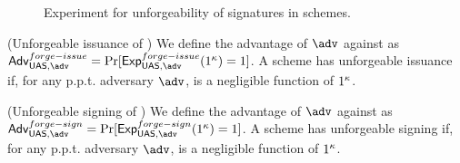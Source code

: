 \begin{figure}[htp!]
  \caption{Experiment for unforgeability of signatures in \UAS schemes.}
  \label{fig:exp-uas-unfor-sign}
\end{figure}

\begin{definition}{(Unforgeable issuance of \UAS)}
  \label{def:issue-forge-uas}  
  We define the advantage \AdvForgeIssue of $\adv$ against \ExpForgeIssue as
  $\AdvForgeIssue=\Pr\lbrack\ExpForgeIssue(1^\secpar)=1\rbrack$.
  A \UAS scheme has unforgeable issuance if, for any p.p.t. adversary $\adv$,
  \AdvForgeIssue is a negligible function of $1^\kappa$.
\end{definition}

\begin{definition}{(Unforgeable signing of \UAS)}
  \label{def:sign-forge-uas}  
  We define the advantage \AdvForgeSign of $\adv$ against \ExpForgeSign as
  $\AdvForgeSign=\Pr\lbrack\ExpForgeSign(1^\secpar)=1\rbrack$.
  A \UAS scheme has unforgeable signing if, for any p.p.t. adversary $\adv$,
  \AdvForgeSign is a negligible function of $1^\kappa$.
\end{definition}

